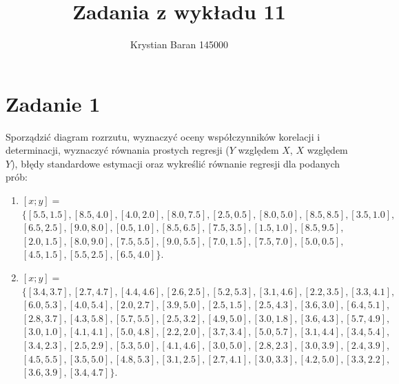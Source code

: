 \documentclass{article}
\author{Krystian Baran 145000}
\title{Zadania z wykładu 11}
\begin{document}
\maketitle
\newpage

\tableofcontents
\newpage
\section{Zadanie 1}

Sporządzić diagram rozrzutu, wyznaczyć oceny współczynników korelacji i determinacji, wyznaczyć równania prostych regresji ($Y$ względem $X$, $X$ względem $Y$), błędy standardowe estymacji oraz wykreślić równanie regresji dla podanych prób:

\begin{enumerate}[label = \alph*)]

\item $[x; y] = $\\
$\{[5.5, 1.5], [8.5, 4.0], [4.0, 2.0], [8.0, 7.5], [2.5, 0.5], [8.0, 5.0], [8.5, 8.5], [3.5, 1.0], $\\
$[6.5, 2.5], [9.0, 8.0], [0.5, 1.0], [8.5, 6.5], [7.5, 3.5], [1.5, 1.0], [8.5, 9.5], $\\
$[2.0, 1.5], [8.0, 9.0], [7.5, 5.5], [9.0, 5.5], [7.0, 1.5], [7.5, 7.0], [5.0, 0.5], $\\
$[4.5, 1.5], [5.5, 2.5], [6.5, 4.0]\}$.

\item $[x; y] = $\\
$\{[3.4, 3.7], [2.7, 4.7], [4.4, 4.6], [2.6, 2.5], [5.2, 5.3], [3.1, 4.6], [2.2, 3.5], [3.3, 4.1], $\\
$[6.0, 5.3], [4.0, 5.4], [2.0, 2.7], [3.9, 5.0], [2.5, 1.5], [2.5, 4.3], [3.6, 3.0], [6.4, 5.1], $\\
$[2.8, 3.7], [4.3, 5.8], [5.7, 5.5], [2.5, 3.2], [4.9, 5.0], [3.0, 1.8], [3.6, 4.3], [5.7,4.9], $\\
$[3.0, 1.0], [4.1, 4.1], [5.0, 4.8], [2.2, 2.0], [3.7, 3.4], [5.0, 5.7], [3.1, 4.4], [3.4,5.4], $\\
$[3.4, 2.3], [2.5, 2.9], [5.3, 5.0], [4.1,4.6], [3.0, 5.0], [2.8, 2.3], [3.0, 3.9], [2.4, 3.9], $\\
$[4.5, 5.5], [3.5, 5.0], [4.8, 5.3], [3.1, 2.5], [2.7, 4.1], [3.0, 3.3], [4.2, 5.0], [3.3, 2.2], $\\
$[3.6, 3.9], [3.4, 4.7]\}$.
\end{enumerate}
\end{document}
